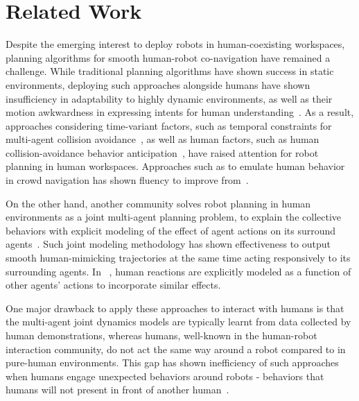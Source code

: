 \documentclass[letterpaper, 10 pt, conference]{ieeeconf}  %
\begin{document}
\section{Related Work}
Despite the emerging interest to deploy robots in human-coexisting workspaces, 
planning algorithms for smooth human-robot co-navigation have remained a 
challenge. While traditional planning algorithms have shown success in static 
environments, deploying such approaches alongside humans have shown 
insufficiency in adaptability to highly dynamic environments, as well as their motion 
awkwardness in expressing intents for human 
understanding~\cite{lichtenthaler2012influence,dragan2013legibility,kruse2012legible}. 
As a result, approaches considering time-variant factors, such as temporal constraints for multi-agent collision 
avoidance~\cite{van2011reciprocal}, as well as human factors, such as human 
collision-avoidance behavior anticipation~\cite{helbing1995social}, have raised attention for robot planning in human workspaces. Approaches such as to emulate human behavior in crowd 
navigation has shown fluency to improve from~\cite{shiomi2014towards}.

On the other hand, another community solves robot planning in human environments as a 
joint multi-agent planning problem, to explain the collective behaviors with 
explicit modeling of the effect of agent actions on its 
surround agents~\cite{trautman2010unfreezing,kuderer2012feature,mavrogiannis2016decentralized}. Such joint modeling methodology has 
shown effectiveness to output smooth human-mimicking trajectories at the same 
time acting responsively to its surrounding agents. In ~\cite{sadigh2016planning}, human reactions are 
explicitly modeled as a function of other agents' actions to incorporate 
similar effects. 

One major drawback to apply these approaches to interact with humans is that the 
multi-agent joint dynamics models are typically learnt from data collected by 
human demonstrations, whereas humans, well-known in the human-robot 
interaction community, do not act the same way around a robot compared to in 
pure-human environments. This gap has shown 
inefficiency of such approaches when humans engage unexpected behaviors 
around robots - behaviors that humans will not present in front of another 
human~\cite{pfeiffer2016predicting}. 
\end{document}
